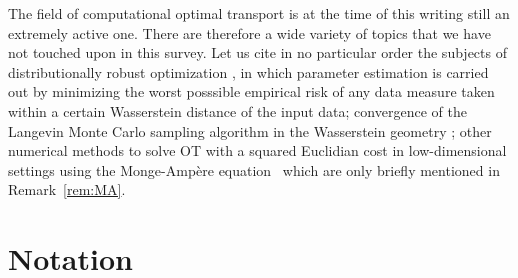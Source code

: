 The field of computational optimal transport is at the time of this writing still an extremely active one. There are therefore a wide variety of topics that we have not touched upon in this survey. Let us cite in no particular order the subjects of distributionally robust optimization \citep{NIPS2015_5745,esfahani2018data,NIPS2018_7534,NIPS2018_8015}, in which parameter estimation is carried out by minimizing the worst posssible empirical risk of any data measure taken within a certain Wasserstein distance of the input data; convergence of the Langevin Monte Carlo sampling algorithm in the Wasserstein geometry \citep{dalalyan2017user,pmlr-v65-dalalyan17a,pmlr-v75-bernton18a}; other numerical methods to solve OT with a squared Euclidian cost in low-dimensional settings using the Monge-Amp\`ere equation~\citep{froese2011convergent,benamou2014numerical,sulman2011efficient} which are only briefly mentioned in Remark~\ref{rem:MA}.




\section*{Notation}

